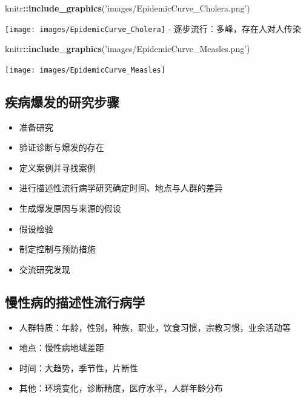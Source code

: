 \documentclass[
]{book}
\newenvironment{Shaded}{\begin{snugshade}}{\end{snugshade}}
\newcommand{\KeywordTok}[1]{\textcolor[rgb]{0.13,0.29,0.53}{\textbf{#1}}}
\newcommand{\NormalTok}[1]{#1}
\newcommand{\OperatorTok}[1]{\textcolor[rgb]{0.81,0.36,0.00}{\textbf{#1}}}
\newcommand{\StringTok}[1]{\textcolor[rgb]{0.31,0.60,0.02}{#1}}
\providecommand{\tightlist}{%
  \setlength{\itemsep}{0pt}\setlength{\parskip}{0pt}}
\begin{document}
\begin{Shaded}
\begin{Highlighting}[]
\NormalTok{knitr}\OperatorTok{::}\KeywordTok{include_graphics}\NormalTok{(}\StringTok{'images/EpidemicCurve_Cholera.png'}\NormalTok{)}
\end{Highlighting}
\end{Shaded}

\texttt{[image: images/EpidemicCurve\_Cholera]}
- 逐步流行：多峰，存在人对人传染

\begin{Shaded}
\begin{Highlighting}[]
\NormalTok{knitr}\OperatorTok{::}\KeywordTok{include_graphics}\NormalTok{(}\StringTok{'images/EpidemicCurve_Measles.png'}\NormalTok{)}
\end{Highlighting}
\end{Shaded}

\texttt{[image: images/EpidemicCurve\_Measles]}

\hypertarget{ux75beux75c5ux7206ux53d1ux7684ux7814ux7a76ux6b65ux9aa4}{%
\subsection{疾病爆发的研究步骤}\label{ux75beux75c5ux7206ux53d1ux7684ux7814ux7a76ux6b65ux9aa4}}

\begin{itemize}
\tightlist
\item
  准备研究
\item
  验证诊断与爆发的存在
\item
  定义案例并寻找案例
\item
  进行描述性流行病学研究确定时间、地点与人群的差异
\item
  生成爆发原因与来源的假设
\item
  假设检验
\item
  制定控制与预防措施
\item
  交流研究发现
\end{itemize}

\hypertarget{ux6162ux6027ux75c5ux7684ux63cfux8ff0ux6027ux6d41ux884cux75c5ux5b66}{%
\subsection{慢性病的描述性流行病学}\label{ux6162ux6027ux75c5ux7684ux63cfux8ff0ux6027ux6d41ux884cux75c5ux5b66}}

\begin{itemize}
\tightlist
\item
  人群特质：年龄，性别，种族，职业，饮食习惯，宗教习惯，业余活动等
\item
  地点：慢性病地域差距
\item
  时间：大趋势，季节性，片断性
\item
  其他：环境变化，诊断精度，医疗水平，人群年龄分布
\end{itemize}
\end{document}
